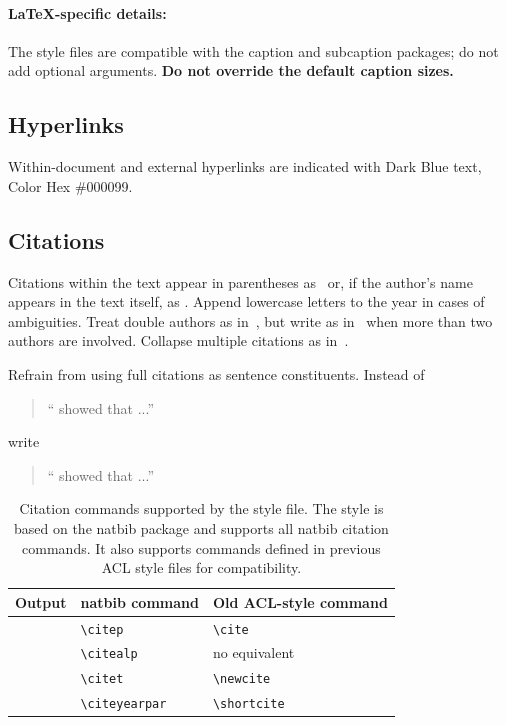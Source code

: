 \documentclass[11pt,a4paper]{article}
\begin{document}
\paragraph{\LaTeX-specific details:}
The style files are compatible with the caption and subcaption packages; do not add optional arguments.
\textbf{Do not override the default caption sizes.}


\subsection{Hyperlinks}
Within-document and external hyperlinks are indicated with Dark Blue text, Color Hex \#000099.

\subsection{Citations}
Citations within the text appear in parentheses as~\citep{Gusfield:97} or, if the author's name appears in the text itself, as \citet{Gusfield:97}.
Append lowercase letters to the year in cases of ambiguities.
Treat double authors as in~\citep{Aho:72}, but write as in~\citep{Chandra:81} when more than two authors are involved. Collapse multiple citations as in~\citep{Gusfield:97,Aho:72}.

Refrain from using full citations as sentence constituents.
Instead of
\begin{quote}
  ``\citep{Gusfield:97} showed that ...''
\end{quote}
write
\begin{quote}
  ``\citet{Gusfield:97} showed that ...''
\end{quote}

\begin{table}
  \centering
  \begin{tabular}{lll}
    \hline
    \textbf{Output}           & \textbf{natbib command}       & \textbf{Old ACL-style command} \\
    \hline
    \citep{Gusfield:97}       & \small\verb|\citep| & \small\verb|\cite|  \\
    \citealp{Gusfield:97}     & \small\verb|\citealp| & no equivalent                  \\
    \citet{Gusfield:97}       & \small\verb|\citet| & \small\verb|\newcite|  \\
    \citeyearpar{Gusfield:97} & \small\verb|\citeyearpar| & \small\verb|\shortcite|  \\
    \hline
  \end{tabular}
  \caption{\label{citation-guide}
    Citation commands supported by the style file.
    The style is based on the natbib package and supports all natbib citation commands.
    It also supports commands defined in previous ACL style files for compatibility.
  }
\end{table}
\end{document}
